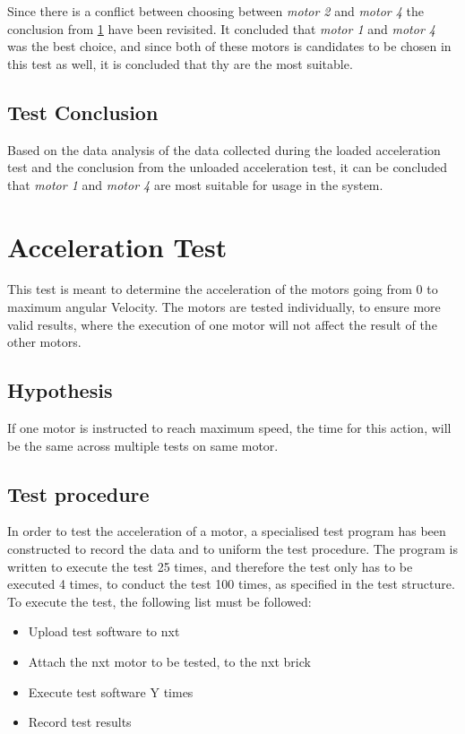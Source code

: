 Since there is a conflict between choosing between \emph{motor 2} and \emph{motor 4} the conclusion from \cref{sec:accel_test} have been revisited. It concluded that \emph{motor 1} and \emph{motor 4} was the best choice, and since both of these motors is candidates to be chosen in this test as well, it is concluded that thy are the most suitable.

\subsection{Test Conclusion}
Based on the data analysis of the data collected during the loaded acceleration test and the conclusion from the unloaded acceleration test, it can be concluded that \emph{motor 1} and \emph{motor 4} are most suitable for usage in the system.



\section{Acceleration Test} \label{sec:accel_test} %
This test is meant to determine the acceleration of the motors going from 0 to maximum angular Velocity. The motors are tested individually, to ensure more valid results, where the execution of one motor will not affect the result of the other motors.

\subsection{Hypothesis} If one motor is instructed to reach maximum speed, the time for this action, will be the same across multiple tests on same motor.

\subsection{Test procedure}
In order to test the acceleration of a motor, a specialised test program has been constructed to record the data and to uniform the test procedure. The program is written to execute the test 25 times, and therefore the test only has to be executed 4 times, to conduct the test 100 times, as specified in the test structure. To execute the test, the following list must be followed:

\begin{itemize}
	\item Upload test software to \gls{nxt}
	\item Attach the \gls{nxt} motor to be tested, to the \gls{nxt} brick
	\item Execute test software Y times
	\item Record test results
\end{itemize}

